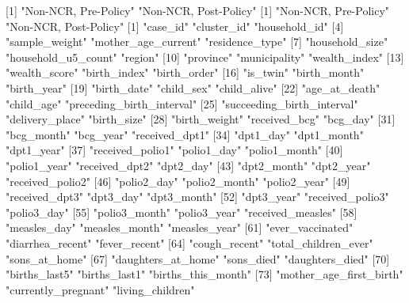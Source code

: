 [1] "Non-NCR, Pre-Policy"  "Non-NCR, Post-Policy"
[1] "Non-NCR, Pre-Policy"  "Non-NCR, Post-Policy"
  [1] "case_id"                       "cluster_id"                    "household_id"                 
  [4] "sample_weight"                 "mother_age_current"            "residence_type"               
  [7] "household_size"                "household_u5_count"            "region"                       
 [10] "province"                      "municipality"                  "wealth_index"                 
 [13] "wealth_score"                  "birth_index"                   "birth_order"                  
 [16] "is_twin"                       "birth_month"                   "birth_year"                   
 [19] "birth_date"                    "child_sex"                     "child_alive"                  
 [22] "age_at_death"                  "child_age"                     "preceding_birth_interval"     
 [25] "succeeding_birth_interval"     "delivery_place"                "birth_size"                   
 [28] "birth_weight"                  "received_bcg"                  "bcg_day"                      
 [31] "bcg_month"                     "bcg_year"                      "received_dpt1"                
 [34] "dpt1_day"                      "dpt1_month"                    "dpt1_year"                    
 [37] "received_polio1"               "polio1_day"                    "polio1_month"                 
 [40] "polio1_year"                   "received_dpt2"                 "dpt2_day"                     
 [43] "dpt2_month"                    "dpt2_year"                     "received_polio2"              
 [46] "polio2_day"                    "polio2_month"                  "polio2_year"                  
 [49] "received_dpt3"                 "dpt3_day"                      "dpt3_month"                   
 [52] "dpt3_year"                     "received_polio3"               "polio3_day"                   
 [55] "polio3_month"                  "polio3_year"                   "received_measles"             
 [58] "measles_day"                   "measles_month"                 "measles_year"                 
 [61] "ever_vaccinated"               "diarrhea_recent"               "fever_recent"                 
 [64] "cough_recent"                  "total_children_ever"           "sons_at_home"                 
 [67] "daughters_at_home"             "sons_died"                     "daughters_died"               
 [70] "births_last5"                  "births_last1"                  "births_this_month"            
 [73] "mother_age_first_birth"        "currently_pregnant"            "living_children"              
